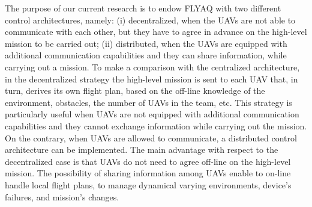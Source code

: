 \documentclass[letterpaper, 10 pt, conference]{ieeeconf}
\begin{document}
The purpose of our current research is to endow FLYAQ with two different control architectures, namely: (i) decentralized, when the UAVs are not able to communicate with each other, but they have to agree in advance on the high-level mission to be carried out; (ii) distributed, when the UAVs are equipped with additional communication capabilities and they can share information, while carrying out a mission.
%
%
To make a comparison with the centralized architecture, in the decentralized strategy the high-level mission is sent to each UAV that, in turn, derives its own flight plan, based on the off-line knowledge of the environment, obstacles, the number of UAVs in the team, etc. This strategy is particularly useful when UAVs are not equipped with additional communication capabilities and they cannot exchange information while carrying out the mission. 
%
On the contrary, when UAVs are allowed to communicate, a distributed control architecture can be implemented. The main advantage with respect to the decentralized case is that UAVs do not need to agree off-line on the high-level mission. The possibility of sharing information among UAVs enable to on-line handle local flight plans, to manage dynamical varying environments, device's failures, and mission's changes. 
\end{document}
